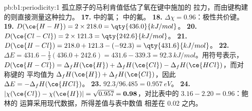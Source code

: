 \begin{solution}{pb:b1:periodicity:1}
孤立原子的马利肯值低估了氧在键中施加的
拉力，而由键构建的则直接测量这种拉力。
\textbf{17.}  中的氯； 中的氟。
\textbf{18.} $\Delta\chi = 0.96$：极性共价键。
\textbf{19.} $D(\ce{H-H}) = 2 \times 218.0 = \qty{436.0}{kJ/mol}$。
\textbf{20.} $D(\ce{Cl-Cl}) = 2 \times 121.3 = \qty{242.6}{kJ/mol}$。
\textbf{21.} $D(\ce{H-Cl}) = 218.0 + 121.3 - (-92.3) = \qty{431.6}{kJ/mol}$。
\textbf{22.} $\Delta E = 431.6 - \tfrac12(436.0 + 242.6) = 431.6 - 339.3 =
\qty{92.3}{kJ/mol}$。用符号表示，$D(\ce{H-Cl}) = \Delta_fH(\ce{H}) +
\Delta_fH(\ce{Cl}) - \Delta_fH(\ce{HCl})$，而对称键的
平均值为 $\Delta_fH(\ce{H}) + \Delta_fH(\ce{Cl})$，因此 $\Delta E =
-\Delta_fH(\ce{HCl})$。
\textbf{23.} $92.3/96.485 = \qty{0.957}{eV}$。
\textbf{24.} $|\chi(\ce{Cl}) - \chi(\ce{H})| = \sqrt{0.957} =
\textbf{0.98}$，对比表中的 $3.16 - 2.20 = 0.96$：鲍林的
运算采用现代数据，所得差值与表中数值
相差在 0.02 之内。
\end{solution}
